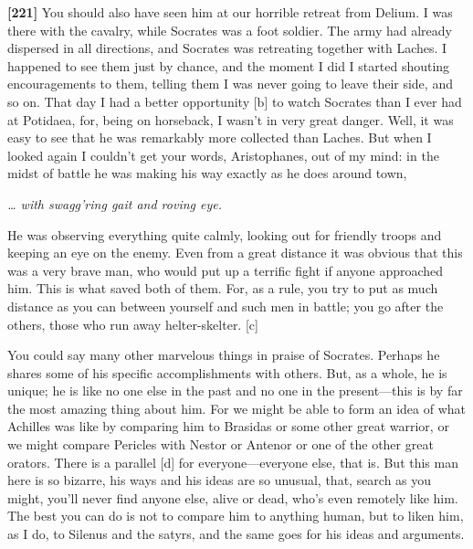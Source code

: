 {\bf {[}221{]}} You should also have seen him at our horrible retreat
from Delium. I was
there with the cavalry, while Socrates was a foot soldier. The army had
already dispersed in all directions, and Socrates was retreating
together with Laches. I happened to see them just by chance, and the
moment I did I started shouting encouragements to them, telling them I
was never going to leave their side, and so on. That day I had a better
opportunity {[}b{]} to watch Socrates than I ever had at Potidaea, for,
being on horseback, I wasn't in very great danger. Well, it was easy to
see that he was remarkably more collected than Laches. But when I looked
again I couldn't get your words, Aristophanes, out of my mind: in the
midst of battle he was making his way exactly as he does around
town,\crlf
\crlf

{\em \ldots{} with swagg'ring gait and roving
eye.}\crlf
\crlf

He was observing everything quite calmly, looking out for friendly
troops and keeping an eye on the enemy. Even from a great distance it
was obvious that this was a very brave man, who would put up a terrific
fight if anyone approached him. This is what saved both of them. For, as
a rule, you try to put as much distance as you can between yourself and
such men in battle; you go after the others, those who run away
helter-skelter. {[}c{]}

You could say many other marvelous things in praise of Socrates. Perhaps
he shares some of his specific accomplishments with others. But, as a
whole, he is unique; he is like no one else in the past and no one in
the present---this is by far the most amazing thing about him. For we
might be able to form an idea of what Achilles was like by comparing him
to Brasidas or some other great warrior, or we might compare Pericles
with Nestor or Antenor or one of the other great
orators. There is a
parallel {[}d{]} for everyone---everyone else, that is. But this man
here is so bizarre, his ways and his ideas are so unusual, that, search
as you might, you'll never find anyone else, alive or dead, who's even
remotely like him. The best you can do is not to compare him to anything
human, but to liken him, as I do, to Silenus and the satyrs, and the
same goes for his ideas and arguments.

